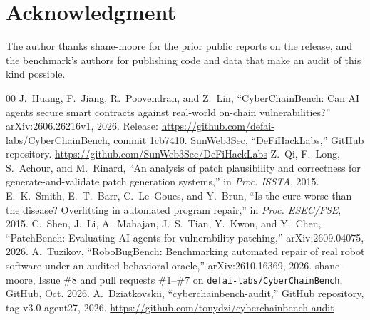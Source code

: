 \documentclass[conference]{IEEEtran}
\newcommand{\code}[1]{\texttt{#1}}
\begin{document}
\section*{Acknowledgment}
The author thanks shane-moore for the prior public reports on the release, and the benchmark's authors for publishing code and data that make an audit of this kind possible.

\begin{thebibliography}{00}
 J.~Huang, F.~Jiang, R.~Poovendran, and Z.~Lin, ``CyberChainBench: Can AI agents secure smart contracts against real-world on-chain vulnerabilities?'' arXiv:2606.26216v1, 2026. Release: \url{https://github.com/defai-labs/CyberChainBench}, commit 1cb7410.
 SunWeb3Sec, ``DeFiHackLabs,'' GitHub repository. \url{https://github.com/SunWeb3Sec/DeFiHackLabs}
 Z.~Qi, F.~Long, S.~Achour, and M.~Rinard, ``An analysis of patch plausibility and correctness for generate-and-validate patch generation systems,'' in \emph{Proc. ISSTA}, 2015.
 E.~K.~Smith, E.~T.~Barr, C.~Le~Goues, and Y.~Brun, ``Is the cure worse than the disease? Overfitting in automated program repair,'' in \emph{Proc. ESEC/FSE}, 2015.
 C.~Shen, J.~Li, A.~Mahajan, J.~S.~Tian, Y.~Kwon, and Y.~Chen, ``PatchBench: Evaluating AI agents for vulnerability patching,'' arXiv:2609.04075, 2026.
 A.~Tuzikov, ``RoboBugBench: Benchmarking automated repair of real robot software under an audited behavioral oracle,'' arXiv:2610.16369, 2026.
 shane-moore, Issue \#8 and pull requests \#1--\#7 on \code{defai-labs/CyberChainBench}, GitHub, Oct. 2026.
 A.~Dziatkovskii, ``cyberchainbench-audit,'' GitHub repository, tag v3.0-agent27, 2026. \url{https://github.com/tonydzi/cyberchainbench-audit}
\end{thebibliography}
\end{document}
